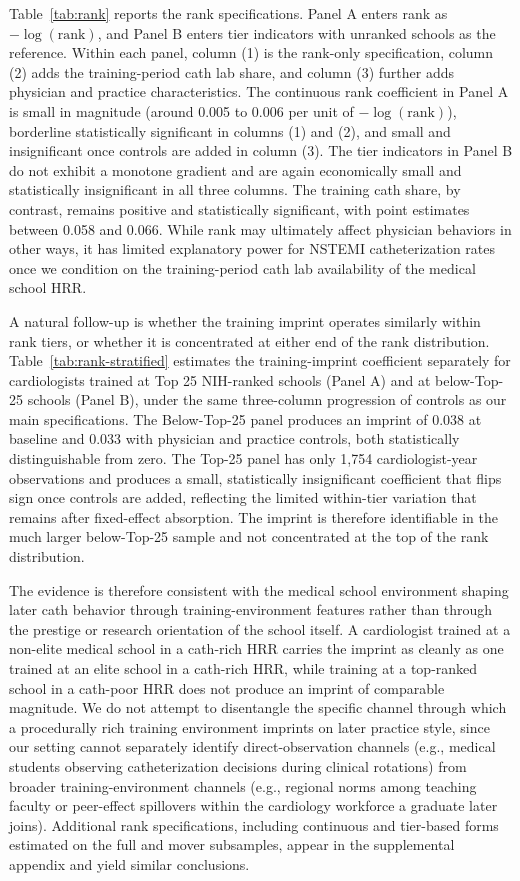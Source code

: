 \documentclass[12pt]{article}
\begin{document}
Table~\ref{tab:rank} reports the rank specifications. Panel A enters rank as $-\log(\text{rank})$, and Panel B enters tier indicators with unranked schools as the reference. Within each panel, column (1) is the rank-only specification, column (2) adds the training-period cath lab share, and column (3) further adds physician and practice characteristics. The continuous rank coefficient in Panel A is small in magnitude (around 0.005 to 0.006 per unit of $-\log(\text{rank})$), borderline statistically significant in columns (1) and (2), and small and insignificant once controls are added in column (3). The tier indicators in Panel B do not exhibit a monotone gradient and are again economically small and statistically insignificant in all three columns. The training cath share, by contrast, remains positive and statistically significant, with point estimates between 0.058 and 0.066. While rank may ultimately affect physician behaviors in other ways, it has limited explanatory power for NSTEMI catheterization rates once we condition on the training-period cath lab availability of the medical school HRR.

A natural follow-up is whether the training imprint operates similarly within rank tiers, or whether it is concentrated at either end of the rank distribution. Table~\ref{tab:rank-stratified} estimates the training-imprint coefficient separately for cardiologists trained at Top 25 NIH-ranked schools (Panel A) and at below-Top-25 schools (Panel B), under the same three-column progression of controls as our main specifications. The Below-Top-25 panel produces an imprint of 0.038 at baseline and 0.033 with physician and practice controls, both statistically distinguishable from zero. The Top-25 panel has only 1,754 cardiologist-year observations and produces a small, statistically insignificant coefficient that flips sign once controls are added, reflecting the limited within-tier variation that remains after fixed-effect absorption. The imprint is therefore identifiable in the much larger below-Top-25 sample and not concentrated at the top of the rank distribution.

The evidence is therefore consistent with the medical school environment shaping later cath behavior through training-environment features rather than through the prestige or research orientation of the school itself. A cardiologist trained at a non-elite medical school in a cath-rich HRR carries the imprint as cleanly as one trained at an elite school in a cath-rich HRR, while training at a top-ranked school in a cath-poor HRR does not produce an imprint of comparable magnitude. We do not attempt to disentangle the specific channel through which a procedurally rich training environment imprints on later practice style, since our setting cannot separately identify direct-observation channels (e.g., medical students observing catheterization decisions during clinical rotations) from broader training-environment channels (e.g., regional norms among teaching faculty or peer-effect spillovers within the cardiology workforce a graduate later joins). Additional rank specifications, including continuous and tier-based forms estimated on the full and mover subsamples, appear in the supplemental appendix and yield similar conclusions.
\end{document}
